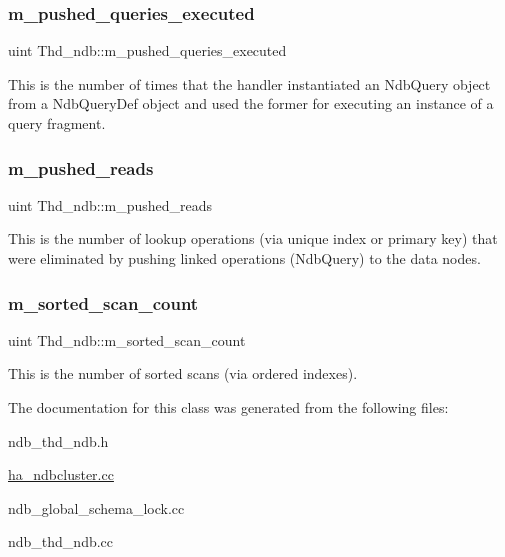 \subsubsection{\texorpdfstring{m\+\_\+pushed\+\_\+queries\+\_\+executed}{m\_pushed\_queries\_executed}}
{\footnotesize\ttfamily uint Thd\+\_\+ndb\+::m\+\_\+pushed\+\_\+queries\+\_\+executed}

This is the number of times that the handler instantiated an Ndb\+Query object from a Ndb\+Query\+Def object and used the former for executing an instance of a query fragment. \mbox{\label{classThd__ndb_adaab6156dc12f5f9c08cf5930b9e61fb}} 
\subsubsection{\texorpdfstring{m\+\_\+pushed\+\_\+reads}{m\_pushed\_reads}}
{\footnotesize\ttfamily uint Thd\+\_\+ndb\+::m\+\_\+pushed\+\_\+reads}

This is the number of lookup operations (via unique index or primary key) that were eliminated by pushing linked operations (Ndb\+Query) to the data nodes. \mbox{\label{classThd__ndb_ae80017f1707f6464befa42e3e36e5986}} 
\subsubsection{\texorpdfstring{m\+\_\+sorted\+\_\+scan\+\_\+count}{m\_sorted\_scan\_count}}
{\footnotesize\ttfamily uint Thd\+\_\+ndb\+::m\+\_\+sorted\+\_\+scan\+\_\+count}

This is the number of sorted scans (via ordered indexes). 

The documentation for this class was generated from the following files\+:\begin{DoxyCompactItemize}
\item 
ndb\+\_\+thd\+\_\+ndb.\+h\item 
\mbox{\hyperlink{ha__ndbcluster_8cc}{ha\+\_\+ndbcluster.\+cc}}\item 
ndb\+\_\+global\+\_\+schema\+\_\+lock.\+cc\item 
ndb\+\_\+thd\+\_\+ndb.\+cc\end{DoxyCompactItemize}
